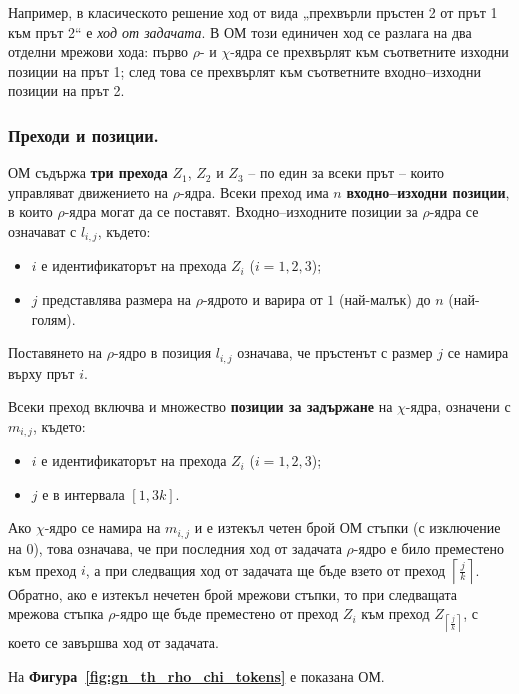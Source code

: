 Например, в класическото решение ход от вида „прехвърли пръстен 2 от прът 1 към прът 2“ е \emph{ход от задачата}. В ОМ този единичен ход се разлага на два отделни мрежови хода: първо \(\rho\)- и \(\chi\)-ядра се прехвърлят към съответните изходни позиции на прът 1; след това се прехвърлят към съответните входно--изходни позиции на прът 2.

\subsubsection*{Преходи и позиции.}

ОМ съдържа \textbf{три прехода} \(Z_1\), \(Z_2\) и \(Z_3\) -- по един за всеки прът -- които управляват движението на \(\rho\)-ядра. Всеки преход има \(n\) \textbf{входно--изходни позиции}, в които \(\rho\)-ядра могат да се поставят. Входно--изходните позиции за \(\rho\)-ядра се означават с \(l_{i,j}\), където:
\begin{itemize}
	\item \(i\) е идентификаторът на прехода \(Z_i\) (\(i=1,2,3\));
	\item \(j\) представлява размера на \(\rho\)-ядрото и варира от \(1\) (най-малък) до \(n\) (най-голям).
\end{itemize}

Поставянето на \(\rho\)-ядро в позиция \(l_{i,j}\) означава, че пръстенът с размер \(j\) се намира върху прът \(i\).


Всеки преход включва и множество \textbf{позиции за задържане} на \(\chi\)-ядра, означени с \(m_{i,j}\), където:
\begin{itemize}
	\item \(i\) е идентификаторът на прехода \(Z_i\) (\(i=1,2,3\));
	\item \(j\) е в интервала \([1,3k]\).
\end{itemize}

Ако \(\chi\)-ядро се намира на \(m_{i,j}\) и е изтекъл четен брой ОМ стъпки (с изключение на \(0\)), това означава, че при последния ход от задачата \(\rho\)-ядро е било преместено към преход \(i\), а при следващия ход от задачата ще бъде взето от преход \(\left\lceil \frac{j}{k} \right\rceil\). Обратно, ако е изтекъл нечетен брой мрежови стъпки, то при следващата мрежова стъпка \(\rho\)-ядро ще бъде преместено от преход \(Z_i\) към преход \(Z_{\left\lceil \frac{j}{k} \right\rceil}\), с което се завършва ход от задачата.

На \textbf{Фигура~\ref{fig:gn_th_rho_chi_tokens}} е показана ОМ.


